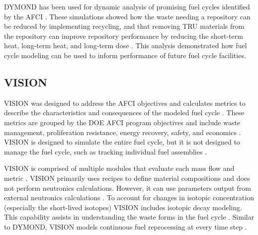 \documentclass{article}
\begin{document}
    \gls{DYMOND} has been used for dynamic analysis of promising fuel cycles 
    identified by the AFCI \cite{yacout_dynamic_2000}. These simulations 
    showed how the waste needing a repository can be reduced by implementing 
    recycling, and that removing \gls{TRU} materials from the repository 
    can improve repository performance by reducing the short-term heat, 
    long-term heat, and long-term dose \cite{yacout_dynamic_2000}. This 
    analysis demonstrated how fuel cycle modeling can be used to inform  
    performance of future fuel cycle facilities. 

\subsection{VISION}
    \Ac{VISION} was designed to address the AFCI objectives \cite{yacout_visionverifiable_2006}
    and calculates metrics to describe the characteristics and 
    consequences of the modeled fuel cycle \cite{yacout_visionverifiable_2006}. 
    These metrics are grouped by the \gls{DOE} AFCI program objectives and include 
    waste management, proliferation resistance, energy recovery, safety, 
    and economics \cite{yacout_visionverifiable_2006}. \gls{VISION} is designed 
    to simulate the entire fuel cycle, but it is not designed to manage the 
    fuel cycle, such as tracking individual fuel assemblies 
    \cite{yacout_visionverifiable_2006}.

    \gls{VISION} is comprised of multiple modules that evaluate each mass flow and 
    metric \cite{yacout_visionverifiable_2006}. \gls{VISION} primarily uses 
    recipes to define material compositions and does not perform
    neutronics calculations. However, it can use parameters output from external 
    neutronics calculations \cite{yacout_visionverifiable_2006}. To account 
    for changes in isotopic concentration (especially the short-lived 
    isotopes) \gls{VISION} includes isotopic decay modeling. This capability 
    assists in 
    understanding the waste forms in the fuel cycle \cite{yacout_visionverifiable_2006}.
    Similar to \gls{DYMOND}, \gls{VISION} models continuous fuel reprocessing at 
    every time step \cite{feng_standardized_2016}. 
\end{document}
